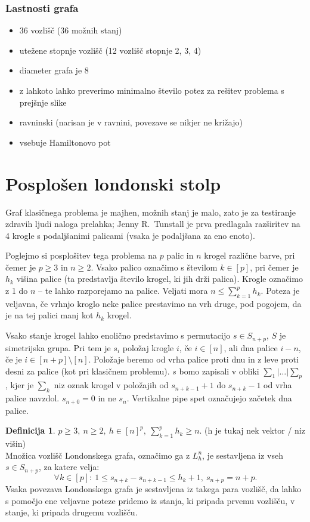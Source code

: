 \documentclass[11pt]{article}
\theoremstyle{definition} %
\newtheorem{definicija}{Definicija}[section]
\theoremstyle{plain} %
\begin{document}
\subsubsection{Lastnosti grafa}
\begin{itemize}
    \item 36 vozlišč (36 možnih stanj)
    \item utežene stopnje vozlišč (12 vozlišč stopnje 2, 3, 4)
    \item diameter grafa je 8
    \item z lahkoto lahko preverimo minimalno število potez za rešitev problema s prejšnje slike
    \item ravninski (narisan je v ravnini, povezave se nikjer ne križajo)
    \item vsebuje Hamiltonovo pot
\end{itemize}


\section{Posplošen londonski stolp}
Graf klasičnega problema je majhen, možnih stanj je malo, zato je za testiranje zdravih ljudi naloga prelahka; Jenny R.\ Tunstall je prva predlagala razširitev na 4 krogle s podaljšanimi palicami (vsaka je podaljšana za eno enoto).

Poglejmo si posplošitev tega problema na $p$ palic in $n$ krogel različne barve, pri čemer je $p \geq 3 \text{ in } n \geq 2$. Vsako palico označimo s številom $k \in [p]$, pri čemer je $h_k$ višina palice (ta predstavlja število krogel, ki jih drži palica). Krogle označimo z 1 do $n$ -- te lahko razporejamo na palice. Veljati mora $n \leq \sum_{k=1}^p h_k$. Poteza je veljavna, če vrhnjo kroglo neke palice prestavimo na vrh druge, pod pogojem, da je na tej palici manj kot $h_k$ krogel.

Vsako stanje krogel lahko enolično predstavimo s permutacijo $s \in S_{n+p}$, $S$ je simetrijska grupa. Pri tem je $s_i$ položaj krogle $i$, če $i \in [n] $, ali dna palice $i-n$, če je $i \in [n+p] \setminus [n] $. Položaje beremo od vrha palice proti dnu in z leve proti desni za palice (kot pri klasičnem problemu). $s$ bomo zapisali v obliki $ \sum_1 | \ldots | \sum_p $,
kjer je $\sum_k$ niz oznak krogel v položajih od $s_{n+k-1} + 1$ do $s_{n+k}-1$ od vrha palice navzdol. $s_{n+0} = 0$ in ne $s_n$. Vertikalne pipe spet označujejo začetek dna palice.

\begin{definicija}
    $p \geq 3,\ n \geq 2,\ h \in [n]^p,\  \sum_{k=1}^p h_k \geq n$. (h je tukaj nek vektor / niz višin)\\ 
    Množica vozlišč {Londonskega grafa}, označimo ga z $L_h^n$, je sestavljena iz vseh $s \in S_{n+p}$, za katere velja:
    \[\forall k \in [p]:\ 1 \leq s_{n+k} - s_{n+k-1} \leq h_k + 1,\ s_{n+p} = n + p .\]
    Vsaka povezava Londonskega grafa je sestavljena iz takega para vozlišč, da lahko s pomočjo ene veljavne poteze pridemo iz stanja, ki pripada prvemu vozlišču, v stanje, ki pripada drugemu vozlišču.
\end{definicija}
\end{document}
